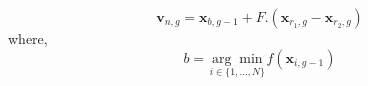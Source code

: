 \begin{equation}
    \mathbf{v}_{n, g}=\mathbf{x}_{b, g-1}+F.\left(\mathbf{x}_{r_{1}, g}-\mathbf{x}_{r_{2}, g}\right)
    \label{DE-best-1}
\end{equation}
where,
$$
b=\underset{i \in\{1, \ldots, N\}}{\arg \min } f\left(\mathbf{x}_{i, g-1}\right)
$$